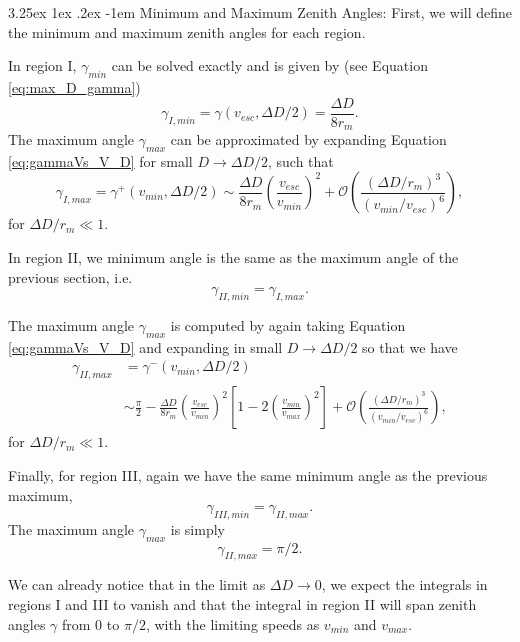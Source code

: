 \documentclass{hitec}
\makeatletter
\numberwithin{equation}{section}
\renewcommand\paragraph{\@startsection{paragraph}{5}{\z@}%
	{3.25ex \@plus1ex \@minus.2ex}%
	{-1em}%
	{\normalfont\normalsize\bfseries}}
\makeatother
\begin{document}
\paragraph{Minimum and Maximum Zenith Angles:}
First, we will define the minimum and maximum zenith angles for each region.

In region I, $\gamma_{min}$ can be solved exactly and is given by (see Equation \eqref{eq:max_D_gamma})
\begin{equation}
\gamma_{I,min} = \gamma(v_{esc},\Delta D/2) = \frac{\Delta D}{8r_m}.
\end{equation}
The maximum angle $\gamma_{max}$ can be approximated by expanding Equation \eqref{eq:gammaVs_V_D} for small $D\to\Delta D/2$, such that
\begin{equation}
\gamma_{I,max} = \gamma^+(v_{min}, \Delta D/2) \sim \frac{\Delta D}{8r_m}\left(\frac{v_{esc}}{v_{min}}\right)^2 + \mathcal{O}\left(\frac{(\Delta D/r_m)^3}{(v_{min}/v_{esc})^6}\right),
\end{equation}
for $\Delta D/r_m \ll 1$.


In region II, we minimum angle is the same as the maximum angle of the previous section, i.e.
\begin{equation}
\gamma_{II,min} = \gamma_{I,max}.
\end{equation}

The maximum angle $\gamma_{max}$ is computed by again taking Equation \eqref{eq:gammaVs_V_D} and expanding in small $D\to\Delta D/2$ so that we have
\begin{align}
\gamma_{II,max} &= \gamma^-(v_{min}, \Delta D/2)\\
 &\sim \frac{\pi}{2} - \frac{\Delta D}{8r_m}\left(\frac{v_{esc}}{v_{min}}\right)^2\left[1-2\left(\frac{v_{min}}{v_{max}}\right)^2\right] + \mathcal{O}\left(\frac{(\Delta D/r_m)^3}{(v_{min}/v_{esc})^6}\right),
\end{align}
for $\Delta D/r_m \ll 1$.

Finally, for region III, again we have the same minimum angle as the previous maximum,
\begin{equation}
\gamma_{III,min} = \gamma_{II,max}.
\end{equation}
The maximum angle $\gamma_{max}$ is simply
\begin{equation}
\gamma_{II,max} = \pi/2.
\end{equation}

We can already notice that in the limit as $\Delta D \to 0$, we expect the integrals in regions I and III to vanish and that the integral in region II will span zenith angles $\gamma$ from $0$ to $\pi/2$, with the limiting speeds as $v_{min}$ and $v_{max}$.
\end{document}

